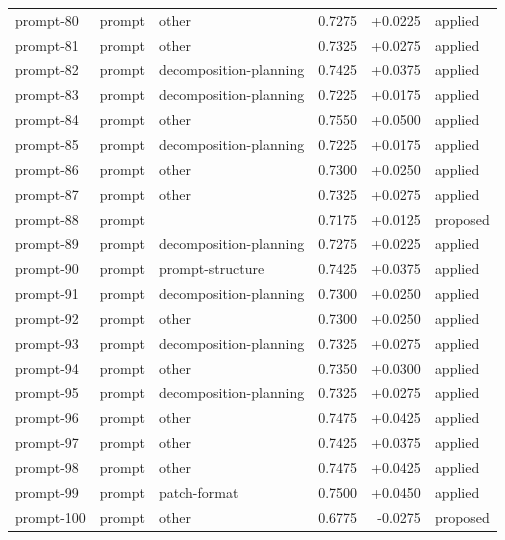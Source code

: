 \begin{center}
\begin{longtable}{llp{5.2cm}rrl}
prompt-80 & prompt & other & 0.7275 & +0.0225 & applied \\
prompt-81 & prompt & other & 0.7325 & +0.0275 & applied \\
prompt-82 & prompt & decomposition-planning & 0.7425 & +0.0375 & applied \\
prompt-83 & prompt & decomposition-planning & 0.7225 & +0.0175 & applied \\
prompt-84 & prompt & other & 0.7550 & +0.0500 & applied \\
prompt-85 & prompt & decomposition-planning & 0.7225 & +0.0175 & applied \\
prompt-86 & prompt & other & 0.7300 & +0.0250 & applied \\
prompt-87 & prompt & other & 0.7325 & +0.0275 & applied \\
prompt-88 & prompt &  & 0.7175 & +0.0125 & proposed \\
prompt-89 & prompt & decomposition-planning & 0.7275 & +0.0225 & applied \\
prompt-90 & prompt & prompt-structure & 0.7425 & +0.0375 & applied \\
prompt-91 & prompt & decomposition-planning & 0.7300 & +0.0250 & applied \\
prompt-92 & prompt & other & 0.7300 & +0.0250 & applied \\
prompt-93 & prompt & decomposition-planning & 0.7325 & +0.0275 & applied \\
prompt-94 & prompt & other & 0.7350 & +0.0300 & applied \\
prompt-95 & prompt & decomposition-planning & 0.7325 & +0.0275 & applied \\
prompt-96 & prompt & other & 0.7475 & +0.0425 & applied \\
prompt-97 & prompt & other & 0.7425 & +0.0375 & applied \\
prompt-98 & prompt & other & 0.7475 & +0.0425 & applied \\
prompt-99 & prompt & patch-format & 0.7500 & +0.0450 & applied \\
prompt-100 & prompt & other & 0.6775 & -0.0275 & proposed \\
\bottomrule\end{longtable}\end{center}
\clearpage
